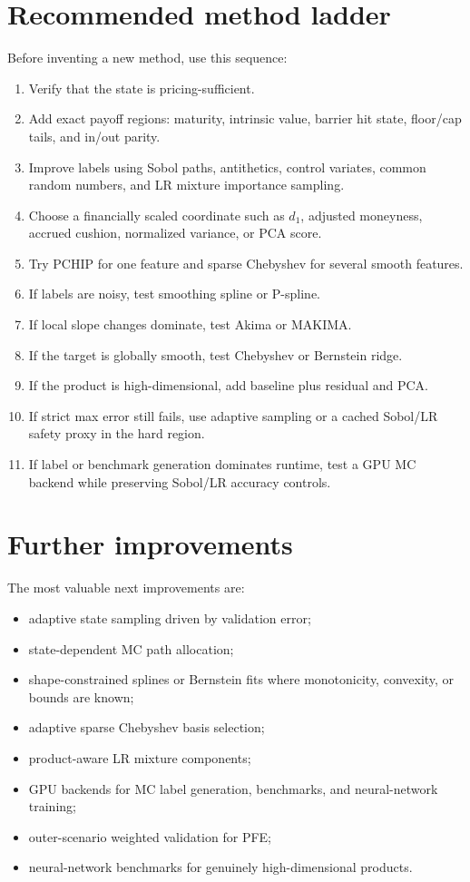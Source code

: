 \documentclass[11pt,oneside]{book}
\theoremstyle{definition}
\begin{document}
\section{Recommended method ladder}
Before inventing a new method, use this sequence:
\begin{enumerate}
  \item Verify that the state is pricing-sufficient.
  \item Add exact payoff regions: maturity, intrinsic value, barrier hit state,
        floor/cap tails, and in/out parity.
  \item Improve labels using Sobol paths, antithetics, control variates, common
        random numbers, and LR mixture importance sampling.
  \item Choose a financially scaled coordinate such as \(d_1\), adjusted
        moneyness, accrued cushion, normalized variance, or PCA score.
  \item Try PCHIP for one feature and sparse Chebyshev for several smooth
        features.
  \item If labels are noisy, test smoothing spline or P-spline.
  \item If local slope changes dominate, test Akima or MAKIMA.
  \item If the target is globally smooth, test Chebyshev or Bernstein ridge.
  \item If the product is high-dimensional, add baseline plus residual and PCA.
  \item If strict max error still fails, use adaptive sampling or a cached
        Sobol/LR safety proxy in the hard region.
  \item If label or benchmark generation dominates runtime, test a GPU MC
        backend while preserving Sobol/LR accuracy controls.
\end{enumerate}

\section{Further improvements}
The most valuable next improvements are:
\begin{itemize}
  \item adaptive state sampling driven by validation error;
  \item state-dependent MC path allocation;
  \item shape-constrained splines or Bernstein fits where monotonicity,
        convexity, or bounds are known;
  \item adaptive sparse Chebyshev basis selection;
  \item product-aware LR mixture components;
  \item GPU backends for MC label generation, benchmarks, and neural-network
        training;
  \item outer-scenario weighted validation for PFE;
  \item neural-network benchmarks for genuinely high-dimensional products.
\end{itemize}
\end{document}

